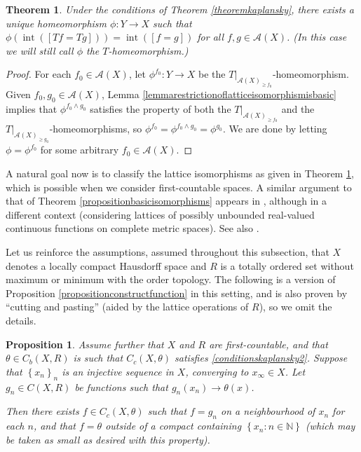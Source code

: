\documentclass[letter,11pt]{amsart}
\theoremstyle{plain}		\newtheorem{theorem}[generalnumbering]{Theorem}
\theoremstyle{plain}		\newtheorem{corollary}[generalnumbering]{Corollary}
\theoremstyle{definition}		\newtheorem{definition}[generalnumbering]{Definition}
\theoremstyle{definition}		\newtheorem{example}[generalnumbering]{Example}
\theoremstyle{plain}		\newtheorem{proposition}[generalnumbering]{Proposition}
\theoremstyle{plain}		\newtheorem{lemma}[generalnumbering]{Lemma}
\theoremstyle{definition}
\begin{document}
\begin{theorem}\label{theoremkaplanskywithoutlowerbound}
	Under the conditions of Theorem \ref{theoremkaplansky}, there exists a unique homeomorphism $\phi\colon Y\to X$ such that $\phi(\operatorname{int}([Tf=Tg]))=\operatorname{int}([f=g])$ for all $f,g\in\mathcal{A}(X)$. (In this case we will still call $\phi$ the \emph{$T$-homeomorphism}.)
\end{theorem}
\begin{proof}
	For each $f_0\in \mathcal{A}(X)$, let $\phi^{f_0}\colon Y\to X$ be the $T|_{\mathcal{A}(X)_{\geq f_0}}$-homeomorphism. Given $f_0,g_0\in\mathcal{A}(X)$, Lemma \ref{lemmarestrictionoflatticeisomorphismisbasic} implies that $\phi^{f_0\land g_0}$ satisfies the property of both the $T|_{\mathcal{A}(X)_{\geq f_0}}$ and the $T|_{\mathcal{A}(X)_{\geq g_0}}$-homeomorphisms, so $\phi^{f_0}=\phi^{f_0\land g_0}=\phi^{g_0}$. We are done by letting $\phi=\phi^{f_0}$ for some arbitrary $f_0\in\mathcal{A}(X)$.
\end{proof}

A natural goal now is to classify the lattice isomorphisms as given in Theorem \ref{theoremkaplanskywithoutlowerbound}, which is possible when we consider first-countable spaces. A similar argument to that of Theorem \ref{propositionbasicisomorphisms} appears in \cite{MR2995073}, although in a different context (considering lattices of possibly unbounded real-valued continuous functions on complete metric spaces). See also \cite{MR2999998,MR3404615}.

Let us reinforce the assumptions, assumed throughout this subsection, that $X$ denotes a locally compact Hausdorff space and $R$ is a totally ordered set without maximum or minimum with the order topology. The following is a version of Proposition \ref{propositionconstructfunction} in this setting, and is also proven by ``cutting and pasting'' (aided by the lattice operations of $R$), so we omit the details.

\begin{proposition}\label{propositionconstructfunctionkaplansky}
	Assume further that $X$ and $R$ are first-countable, and that $\theta\in C_b(X,R)$ is such that $C_c(X,\theta)$ satisfies \ref{conditionskaplansky2}. Suppose that $\left\{x_n\right\}_n$ is an injective sequence in $X$, converging to $x_\infty\in X$. Let $g_n\in C(X,R)$ be functions such that $g_n(x_n)\to \theta(x)$.
	
	Then there exists $f\in C_c(X,\theta)$ such that $f=g_n$ on a neighbourhood of $x_n$ for each $n$, and that $f=\theta$ outside of a compact containing $\left\{x_n:n\in\mathbb{N}\right\}$ (which may be taken as small as desired with this property).
\end{proposition}
\end{document}
